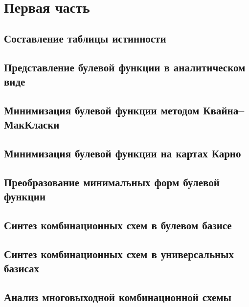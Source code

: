 \documentclass[a4paper, 11pt]{article}
\begin{document}


\tableofcontents
\vspace{2em}
\pagebreak{}

\section{Первая часть}

\subsection{Составление таблицы истинности}

\subsection{Представление булевой функции в аналитическом виде}

\subsection{Минимизация булевой функции методом Квайна–МакКласки}

\subsection{Минимизация булевой функции на картах Карно}

\subsection{Преобразование минимальных форм булевой функции}

\subsection{Синтез комбинационных схем в булевом базисе}

\subsection{Синтез комбинационных схем в универсальных базисах}

\subsection{Анализ многовыходной комбинационной схемы}

\end{document}
